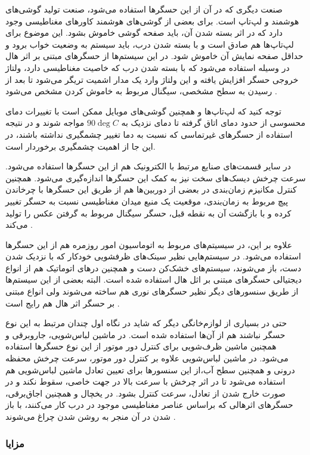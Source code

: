 صنعت دیگری که در آن از این حسگرها استفاده می‌شود، صنعت تولید گوشی‌های هوشمند و لپ‌تاپ است. برای بعضی از گوشی‌های هوشمند کاور‌های مغناطیسی وجود دارد که در اثر بسته شدن آن، باید صفحه گوشی خاموش بشود. این موضوع برای لپ‌تاپ‌ها هم صادق است و با بسته شدن درب، باید سیستم به وضعیت خواب برود و حداقل صفحه نمایش آن خاموش شود. در این سیستم‌ها از حسگرهای مبتنی بر اثر هال در وسیله استفاده می‌شود که با بسته شدن درب که خاصیت مغناطیسی دارد، ولتاژ خروجی حسگر افزایش یافته و این ولتاژ وارد یک مدار اشمیت تریگر می‌شود تا بعد از رسیدن به سطح مشخصی، سیگنال مربوط به خاموش کردن مشخص می‌شود \cite{rs}.


توجه کنید که لپ‌تاپ‌ها و همچنین گوشی‌های موبایل ممکن است با تغییرات دمای محسوسی از حدود دمای اتاق گرفته تا دمای نزدیک به $90\deg C$ مواجه شوند و در نتیجه استفاده از حسگر‌های غیرتماسی که نسبت به دما تغییر چشمگیری نداشته باشند، در این جا از اهمیت چشمگیری برخوردار است.

در سایر قسمت‌های صنایع مرتبط با الکترونیک هم از این حسگر‌ها استفاده می‌شود. سرعت چرخش دیسک‌های سخت
نیز به کمک این حسگر‌ها اندازه‌گیری می‌شود. همچنین کنترل مکانیزم زمان‌بندی در بعضی از دوربین‌ها هم از طریق این حسگرها با چرخاندن پیچ مربوط به زمان‌بندی، موقعیت یک منبع میدان مغناطیسی نسبت به حسگر تغییر کرده و با بازگشت آن به نقطه قبل، حسگر سیگنال مربوط به گرفتن عکس را تولید می‌کند
\cite{magnelink}.


علاوه بر این، در سیسیتم‌های مربوط به اتوماسیون امور روزمره هم از این حسگر‌ها استفاده می‌شود. در سیستم‌هایی نظیر سینک‌های ظرفشویی خودکار که با نزدیک شدن دست، باز می‌شوند، سیستم‌های خشک‌کن دست و همچنین درهای اتوماتیک هم از انواع دیجتیالی حسگر‌های مبتنی بر اثل هال استفاده شده است. البته بعضی از این سیستم‌ها از طریق سنسور‌های دیگر نظیر حسگر‌های نوری هم ساخته می‌شوند ولی انواع مبتنی بر حسگر اثر هال هم رایج است
\cite{magnelink}.


حتی در بسیاری از لوازم‌خانگی دیگر که شاید در نگاه اول چندان مرتبط به این نوع حسگر نباشند هم از آن‌ها استفاده شده است. در ماشین لباس‌شویی، جاروبرقی و همچنین ماشین ظرف‌شویی برای کنترل دور موتور از این نوع حسگر‌ها استفاده می‌شود. در ماشین لباس‌شویی علاوه بر کنترل دور موتور، سرعت چرخش محفظه درونی و همچنین سطح آب،‌از این سنسور‌ها برای تعیین تعادل ماشین لباس‌شویی هم استفاده می‌شود تا در اثر چرخش با سرعت بالا در جهت خاصی، سقوط نکند و در صورت خارج شدن از تعادل، سرعت کنترل بشود. در یخچال و همچنین اجاق‌برقی، حسگر‌های اثرهالی که براساس عناصر مغناطیسی موجود در درب کار‌ می‌کنند، با باز شدن در آن منجر به روشن شدن چراغ می‌شوند
\cite{alleg2}.


\subsubsection{مزایا}

